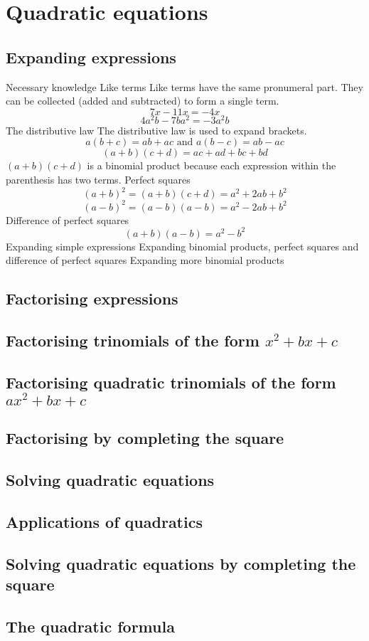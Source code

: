 \section{Quadratic equations}
\begin{outline}

\0
\subsection{Expanding expressions}
	\1 Necessary knowledge
		\2 Like terms
			\3 Like terms have the same pronumeral part. They can be collected (added and subtracted) to form a single term.
				\[7x - 11x = -4x\]
				\[4a^2b - 7ba^2 = -3a^2b\]
		\2 The distributive law
			\3 The distributive law is used to expand brackets.
				\[a(b + c) = ab + ac \text{ and } a(b - c) = ab - ac\]
				\[(a + b)(c + d) = ac + ad + bc + bd\]
	 	 	$(a + b)(c + d)$ is a binomial product because each expression within the parenthesis has two terms.
		\2 Perfect squares
	 	 	\[(a + b)^2 = (a + b)(c + d) = a^2 + 2ab + b^2\]
	 	 	\[(a - b)^2 = (a - b)(a - b) = a^2 - 2ab + b^2\]
		\2 Difference of perfect squares
	 	 	\[(a + b)(a - b) = a^2 - b^2\]
	\1 Expanding simple expressions
	\1 Expanding binomial products, perfect squares and difference of perfect squares
	\1 Expanding more binomial products

\0
\subsection{Factorising expressions}

\0
\subsection{Factorising trinomials of the form $x^2 + bx + c$}

\0
\subsection{Factorising quadratic trinomials of the form $ax^2 + bx + c$}

\0
\subsection{Factorising by completing the square}

\0
\subsection{Solving quadratic equations}

\0
\subsection{Applications of quadratics}

\0
\subsection{Solving quadratic equations by completing the square}

\0
\subsection{The quadratic formula}

\end{outline}
